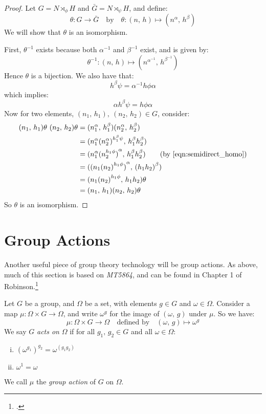 \begin{proof}
    Let \(G = N \rtimes_\phi H\) and \(\bar{G} = N \rtimes_\psi H\), and define:
    \[\theta:G \to \bar{G} \quad \text{by} \quad \theta:(n,\,h) \mapsto (n^\alpha,\,h^\beta)\]
    We will show that \(\theta\) is an isomorphism.

    First, \(\theta^{-1}\) exists because both \(\alpha^{-1}\) and \(\beta^{-1}\) exist, and is given by:
    \[\theta^{-1}:(n,\,h) \mapsto (n^{\alpha^{-1}},\,h^{\beta^{-1}})\]
    Hence \(\theta\) is a bijection.
    We also have that:
    \[h^\beta\psi = \alpha^{-1}h\phi\alpha\]
    which implies:
    \[\alpha h^\beta\psi = h\phi\alpha \tag{\ast}\label{eqn:semidirect_homo}\]
    Now for two elements, \((n_1,\,h_1),\ (n_2,\,h_2) \in G\), consider:
    \begin{align*}
        (n_1,\, h_1)\theta\ (n_2,\, h_2)\theta &= (n_1^\alpha,\, h_1^\beta)(n_2^\alpha,\, h_2^\beta) \\
        &= (n_1^\alpha {(n_2^\alpha)}^{h_1^\beta\psi},\, h_1^\beta h_2^\beta) \\
        &= (n_1^\alpha {(n_2^{h_1\phi})}^\alpha,\, h_1^\beta h_2^\beta) \tag{by~\ref{eqn:semidirect_homo}} \\
        &= ({(n_1 {(n_2)}^{h_1\phi})}^\alpha,\, {(h_1 h_2)}^\beta) \\
        &= (n_1 {(n_2)}^{h_1\phi},\, h_1 h_2)\theta \\
        &= (n_1,\, h_1)(n_2,\, h_2)\theta
    \end{align*}
    So \(\theta\) is an isomorphism.
\end{proof}

\section{Group Actions}
Another useful piece of group theory technology will be group actions.
As above, much of this section is based on \textit{MT5864}, and can be found in Chapter 1 of Robinson.\footcite{robinson1982}

\begin{definition}
    \raggedright
    Let \(G\) be a group, and \(\Omega\) be a set, with elements \(g \in G\) and \(\omega \in \Omega\).
    Consider a map \(\mu:\Omega \times G \to \Omega\), and write \(\omega^g\) for the image of \((\omega,\,g)\) under
    \(\mu\).
    So we have:
    \[\mu:\Omega \times G \to \Omega \quad \text{defined by} \quad (\omega,\,g) \mapsto \omega^g\]
    We say \(G\) \emph{acts on} \(\Omega\) if for all \(g_1,\,g_2 \in G\) and all \(\omega \in \Omega\):
    \begin{enumerate}[(i)]
        \item \({(\omega^{g_1})}^{g_2} = \omega^{(g_1 g_2)}\)
        \item \(\omega^1 = \omega\)
    \end{enumerate}
    We call \(\mu\) the \emph{group action} of \(G\) on \(\Omega\).
\end{definition}

